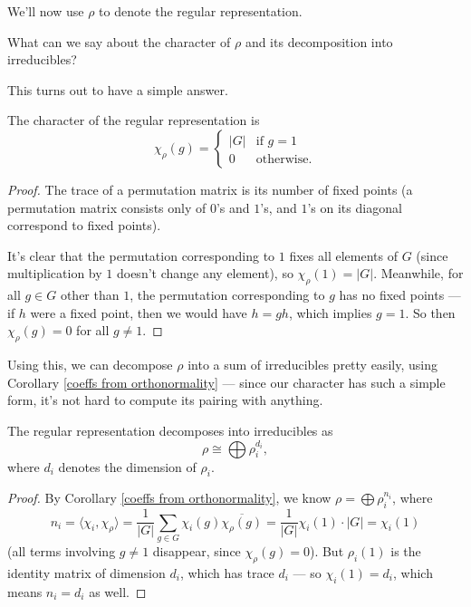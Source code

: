 We'll now use $\rho$ to denote the regular representation. 

\begin{qq}
What can we say about the character of $\rho$ and its decomposition into irreducibles?
\end{qq}

This turns out to have a simple answer. 

\begin{proposition}
    The character of the regular representation is \[\chi_\rho(g) = \begin{cases} |G| & \text{if } g = 1 \\ 0 & \text{otherwise}.\end{cases}\] 
\end{proposition}

\begin{proof}
    The trace of a permutation matrix is its number of fixed points (a permutation matrix consists only of $0$'s and $1$'s, and $1$'s on its diagonal correspond to fixed points). 
    
    It's clear that the permutation corresponding to $1$ fixes all elements of $G$ (since multiplication by $1$ doesn't change any element), so $\chi_\rho(1) = \lvert G \rvert$. Meanwhile, for all $g \in G$ other than $1$, the permutation corresponding to $g$ has no fixed points --- if $h$ were a fixed point, then we would have $h = gh$, which implies $g = 1$. So then $\chi_\rho(g) = 0$ for all $g \neq 1$. 
\end{proof}

Using this, we can decompose $\rho$ into a sum of irreducibles pretty easily, using Corollary \ref{coeffs from orthonormality} --- since our character has such a simple form, it's not hard to compute its pairing with anything. 

\begin{proposition} \label{decomposition of regular rep}
    The regular representation decomposes into irreducibles as \[\rho \cong \bigoplus \rho_i^{d_i},\] where $d_i$ denotes the dimension of $\rho_i$. 
\end{proposition}

\begin{proof}
    By Corollary \ref{coeffs from orthonormality}, we know $\rho = \bigoplus \rho_i^{n_i}$, where \[n_i = \langle \chi_i, \chi_\rho \rangle = \frac{1}{|G|}\sum_{g \in G} \chi_i(g)\overline{\chi_\rho(g)} = \frac{1}{|G|}\chi_i(1)\cdot |G| = \chi_i(1)\] (all terms involving $g \neq 1$ disappear, since $\chi_\rho(g) = 0$). But $\rho_i(1)$ is the identity matrix of dimension $d_i$, which has trace $d_i$ --- so $\chi_i(1) = d_i$, which means $n_i = d_i$ as well. 
\end{proof}

